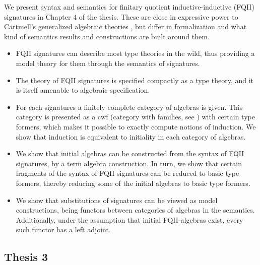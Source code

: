\documentclass[12pt]{article}
\begin{document}
We present syntax and semantics for finitary quotient inductive-inductive (FQII)
signatures in Chapter 4 of the thesis. These are close in expressive power to
Cartmell's generalized algebraic theories \cite{gat}, but differ in
formalization and what kind of semantics results and constructions are built
around them.
\begin{itemize}
\item FQII signatures can describe most type theories in the wild, thus
      providing a model theory for them through the semantics of signatures.
\item The theory of FQII signatures is specified compactly as a type theory, and
      it is itself amenable to algebraic specification.
\item For each signatures a finitely complete category of algebras is given. This
      category is presented as a cwf (category with families, see \cite{cwfs}) with
      certain type formers, which makes it possible to exactly compute notions of
      induction. We show that induction is equivalent to initiality in each category
      of algebras.
\item We show that initial algebras can be constructed from the syntax of FQII signatures,
      by a term algebra construction. In turn, we show that certain fragments of the syntax
      of FQII signatures can be reduced to basic type formers, thereby reducing some of
      the initial algebras to basic type formers.
\item We show that substitutions of signatures can be viewed as model constructions, being
      functors between categories of algebras in the semantics. Additionally, under the
      assumption that initial FQII-algebras exist, every such functor has a left adjoint.
\end{itemize}

\subsection*{Thesis 3}
\end{document}

